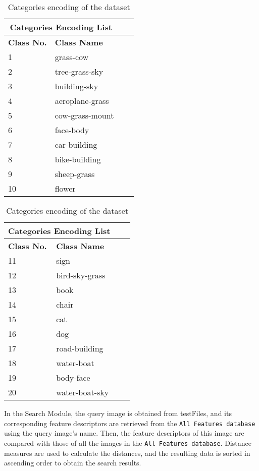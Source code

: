 \documentclass{article}
\begin{document}
\begin{table}[h]
  \caption{Categories encoding of the dataset} %
  \centering %
  \label{table:Categories-encoding}
  \begin{tabular}{ |p{3cm}||p{3cm}|p{3cm}|p{3cm}|  }
    \hline
    \multicolumn{2}{|c|}{Categories Encoding List} \\
    \hline
    \textbf{Class No.}& \textbf{Class Name} \\
    \hline
    1 & grass-cow \\
    2 & tree-grass-sky \\
    3 & building-sky \\
    4 & aeroplane-grass \\
    5 & cow-grass-mount  \\
    6 & face-body \\
    7 & car-building \\
    8 & bike-building \\
    9 & sheep-grass \\
    10 & flower \\
    \hline
    \end{tabular}
  \begin{tabular}{ |p{3cm}||p{3cm}|p{3cm}|p{3cm}|  }
    \hline
    \multicolumn{2}{|c|}{Categories Encoding List} \\
    \hline
    \textbf{Class No.}& \textbf{Class Name} \\
    \hline
    11 & sign \\
    12 & bird-sky-grass \\
    13 & book \\
    14 & chair \\
    15 & cat \\
    16 & dog \\
    17 & road-building \\
    18 & water-boat \\
    19 & body-face \\
    20 & water-boat-sky \\
    \hline
    \end{tabular}
  
\end{table}

In the Search Module, the query image is obtained from testFiles, and its corresponding feature descriptors are retrieved from the \verb+All Features database+ using the query image’s name. Then, the feature descriptors of this image are compared with those of all the images in the \verb+All Features database+. Distance measures are used to calculate the distances, and the resulting data is sorted in ascending order to obtain the search results.
\end{document}
